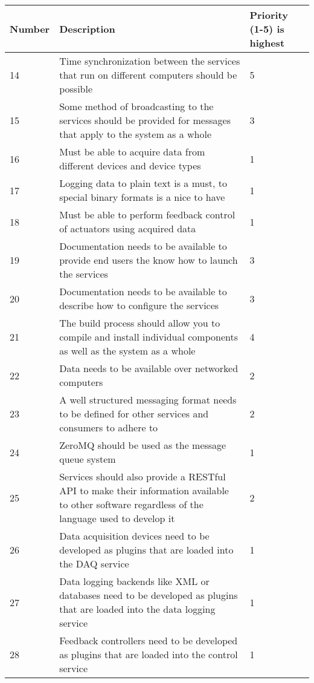     \begin{table}[H]
      \centering
      \begin{tabular}{l p{11cm} p{3cm}}
        \toprule
        Number & Description & Priority (1-5)\newline 1 is highest \\ [0.5ex]
        \midrule
        14 & Time synchronization between the services that run on different computers should be possible & 5 \\
        15 & Some method of broadcasting to the services should be provided for messages that apply to the system as a whole & 3 \\
        16 & Must be able to acquire data from different devices and device types & 1 \\
        17 & Logging data to plain text is a must, to special binary formats is a nice to have & 1 \\
        18 & Must be able to perform feedback control of actuators using acquired data & 1 \\
        19 & Documentation needs to be available to provide end users the know how to launch the services & 3 \\
        20 & Documentation needs to be available to describe how to configure the services & 3 \\
        21 & The build process should allow you to compile and install individual components as well as the system as a whole & 4 \\
        22 & Data needs to be available over networked computers & 2 \\
        23 & A well structured messaging format needs to be defined for other services and consumers to adhere to & 2 \\
        24 & ZeroMQ should be used as the message queue system & 1 \\
        25 & Services should also provide a RESTful API to make their information available to other software regardless of the language used to develop it & 2 \\
        26 & Data acquisition devices need to be developed as plugins that are loaded into the DAQ service & 1 \\
        27 & Data logging backends like XML or databases need to be developed as plugins that are loaded into the data logging service & 1 \\
        28 & Feedback controllers need to be developed as plugins that are loaded into the control service & 1 \\

\end{tabular}
\end{table}

